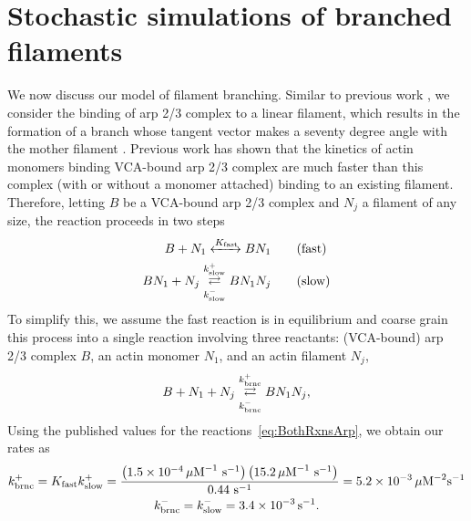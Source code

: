 \documentclass[11pt]{article}
\begin{document}
\section{Stochastic simulations of branched filaments \label{sec:BF}}
We now discuss our model of filament branching. Similar to previous work \cite{ni2019turnover}, we consider the binding of arp 2/3 complex to a linear filament, which results in the formation of a branch whose tangent vector makes a seventy degree angle with the mother filament \cite{pollard2007regulation}. Previous work \cite{beltzner2008pathway} has shown that the kinetics of actin monomers binding VCA-bound arp 2/3 complex are much faster than this complex (with or without a monomer attached) binding to an existing filament. Therefore, letting $B$ be a VCA-bound arp 2/3 complex and $N_j$ a filament of any size, the reaction proceeds in two steps
\begin{subequations}
\label{eq:BothRxnsArp}
\begin{align}
\label{eq:fastrxn}
B + N_1 \xleftrightarrow{K_\text{fast}} BN_1 \qquad & \text{(fast)}\\
BN_1 + N_j \overset{k_\text{slow}^+}{\underset{k_\text{slow}^-}\rightleftarrows} BN_1N_j \qquad & \text{(slow)}
\end{align}
\end{subequations}
To simplify this, we assume the fast reaction is in equilibrium and coarse grain this process into a single reaction involving three reactants: (VCA-bound) arp 2/3 complex $B$, an actin monomer $N_1$, and an actin filament $N_j$, 
\begin{equation}
\label{eq:ArpRxn}
B + N_1 + N_j \overset{k_\text{brnc}^+}{\underset{k_\text{brnc}^-}\rightleftarrows} BN_1N_j,
\end{equation}
Using the published values \cite{beltzner2008pathway} for the reactions\ \eqref{eq:BothRxnsArp}, we obtain our rates as 
\begin{gather*}
k_\text{brnc}^+ = K_\text{fast} k_\text{slow}^+=\frac{\left(1.5 \times 10^{-4} \, \mu\text{M}^{-1}\text{ s}^{-1}\right)\left(15.2 \, \mu\text{M}^{-1}\text{ s}^{-1}\right)}{0.44 \text{ s}^{-1}}=5.2 \times 10^{-3} \, \mu\text{M}^{-2}\text{s}^{-1}\\
k_\text{brnc}^- = k_\text{slow}^- = 3.4 \times 10^{-3} \, \text{s}^{-1}.
\end{gather*}
\end{document}

